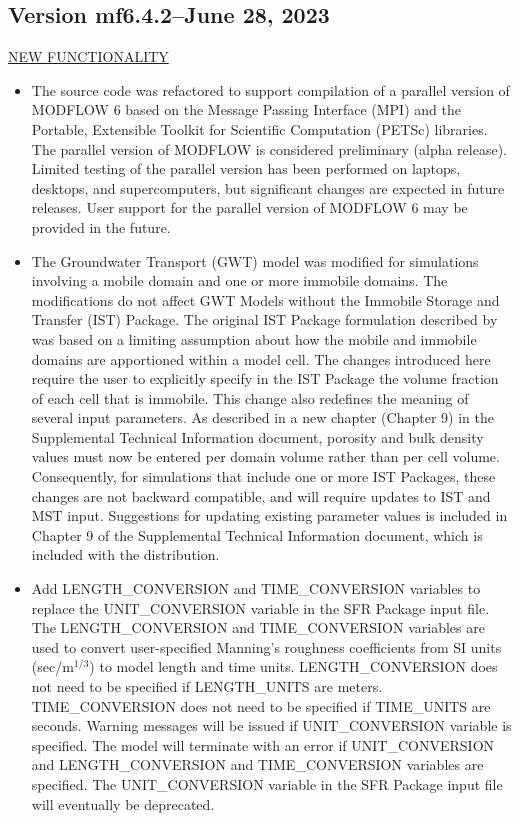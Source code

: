 	
	\subsection{Version mf6.4.2--June 28, 2023}
	
	\underline{NEW FUNCTIONALITY}
	\begin{itemize}
		\item The source code was refactored to support compilation of a parallel version of MODFLOW 6 based on the Message Passing Interface (MPI) and the Portable, Extensible Toolkit for Scientific Computation (PETSc) libraries.  The parallel version of MODFLOW is considered preliminary (alpha release). Limited testing of the parallel version has been performed on laptops, desktops, and supercomputers, but significant changes are expected in future releases. User support for the parallel version of MODFLOW 6 may be provided in the future.
		\item The Groundwater Transport (GWT) model was modified for simulations involving a mobile domain and one or more immobile domains.  The modifications do not affect GWT Models without the Immobile Storage and Transfer (IST) Package.  The original IST Package formulation described by \cite{modflow6gwt} was based on a limiting assumption about how the mobile and immobile domains are apportioned within a model cell.  The changes introduced here require the user to explicitly specify in the IST Package the volume fraction of each cell that is immobile.  This change also redefines the meaning of several input parameters.  As described in a new chapter (Chapter 9) in the Supplemental Technical Information document, porosity and bulk density values must now be entered per domain volume rather than per cell volume.  Consequently, for simulations that include one or more IST Packages, these changes are not backward compatible, and will require updates to IST and MST input.  Suggestions for updating existing parameter values is included in Chapter 9 of the Supplemental Technical Information document, which is included with the distribution.
		\item Add LENGTH\_CONVERSION and TIME\_CONVERSION variables to replace the UNIT\_CONVERSION variable in the SFR Package input file. The LENGTH\_CONVERSION and TIME\_CONVERSION variables are used to convert user-specified Manning's roughness coefficients from SI units (sec/m$^{1/3}$) to model length and time units. LENGTH\_CONVERSION does not need to be specified if LENGTH\_UNITS are meters. TIME\_CONVERSION does not need to be specified if TIME\_UNITS are seconds. Warning messages will be issued if UNIT\_CONVERSION variable is specified. The model will terminate with an error if UNIT\_CONVERSION and LENGTH\_CONVERSION and TIME\_CONVERSION variables are specified. The UNIT\_CONVERSION variable in the SFR Package input file will eventually be deprecated. 

\end{itemize}
